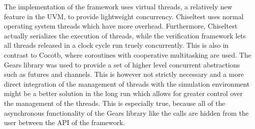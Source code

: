 
The implementation of the framework uses virtual threads, a relatively new feature in the UVM, to provide lightweight concurrency. Chiseltest uses normal operating system threads which have more overhead. Furthermore, Chiseltest actually serializes the execution of threads, while the verification framework lets all threads released in a clock cycle run truely concurrently. This is also in contrast to Cocotb, where coroutines with cooperative multitasking are used. The Gears library was used to provide a set of higher level concurrent abstractions such as futures and channels. This is however not strictly necessary and a more direct integration of the management of threads with the simulation environment might be a better solution in the long run which allows for greater control over the management of the threads. This is especially true, because all of the asynchronous functionality of the Gears library like the  calls are hidden from the user between the API of the framework.


